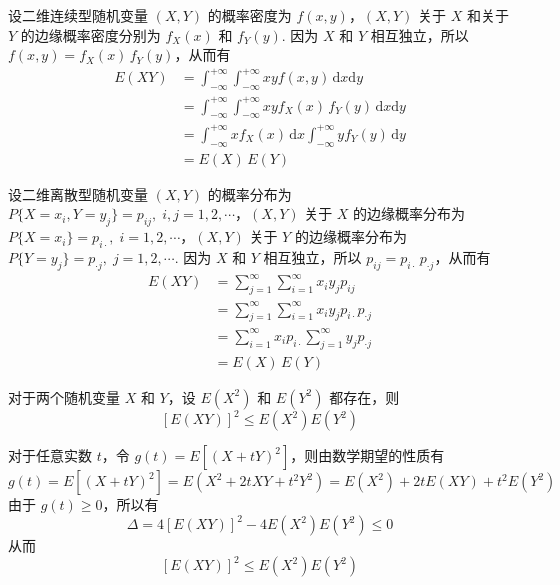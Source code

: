 \begin{myproof}
    设二维连续型随机变量 $(X,Y)$ 的概率密度为 $f(x,y)$，$(X,Y)$ 关于 $X$ 和关于 $Y$ 的边缘概率密度分别为 $f_X(x)$ 和 $f_Y(y)$. 因为 $X$ 和 $Y$ 相互独立，所以 $f(x,y) = f_X(x) \, f_Y(y)$，从而有
    $$
    \begin{aligned}
        E(XY) &= \int_{-\infty}^{+\infty} \int_{-\infty}^{+\infty} xy f(x,y) \, \text{d}x \text{d}y \\
        &= \int_{-\infty}^{+\infty} \int_{-\infty}^{+\infty} xy f_X(x) \, f_Y(y) \, \text{d}x \text{d}y \\
        &= \int_{-\infty}^{+\infty} x f_X(x) \, \text{d}x \int_{-\infty}^{+\infty} y f_Y(y) \, \text{d}y \\
        &= E(X) \, E(Y)
    \end{aligned}
    $$

    设二维离散型随机变量 $(X,Y)$ 的概率分布为 $P\{X=x_i,Y=y_j\} = p_{ij}, \; i,j=1,2,\cdots$，$(X,Y)$ 关于 $X$ 的边缘概率分布为 $P\{X=x_i\}=p_{i\cdot}, \; i=1,2,\cdots$，$(X,Y)$ 关于 $Y$ 的边缘概率分布为 $P\{Y=y_j\}=p_{\cdot j}, \; j=1,2,\cdots$. 因为 $X$ 和 $Y$ 相互独立，所以 $p_{ij} = p_{i\cdot} \, p_{\cdot j}$，从而有
    $$
    \begin{aligned}
        E(XY) &= \sum_{j=1}^{\infty} \sum_{i=1}^{\infty} x_i y_j p_{ij} \\
        &= \sum_{j=1}^{\infty} \sum_{i=1}^{\infty} x_i y_j p_{i\cdot} p_{\cdot j} \\
        &= \sum_{i=1}^{\infty} x_i p_{i\cdot} \sum_{j=1}^{\infty} y_j p_{\cdot j} \\
        &= E(X) \, E(Y)
    \end{aligned}
    $$
\end{myproof}

\begin{property}[（柯西-施瓦茨不等式）]
    对于两个随机变量 $X$ 和 $Y$，设 $E(X^2)$ 和 $E(Y^2)$ 都存在，则
    $$
    [E(XY)]^2 \leqslant E(X^2) E(Y^2)
    $$
\end{property}

\begin{myproof}
    对于任意实数 $t$，令 $g(t) = E[(X+tY)^2]$，则由数学期望的性质有
    $$
    g(t) = E[(X+tY)^2] = E(X^2 + 2tXY + t^2 Y^2) = E(X^2) + 2tE(XY) + t^2 E(Y^2)
    $$
    由于 $g(t) \geqslant 0$，所以有
    $$
    \varDelta = 4 [E(XY)]^2 - 4 E(X^2) E(Y^2) \leqslant 0
    $$
    从而
    $$
    [E(XY)]^2 \leqslant E(X^2) E(Y^2)
    $$
\end{myproof}

